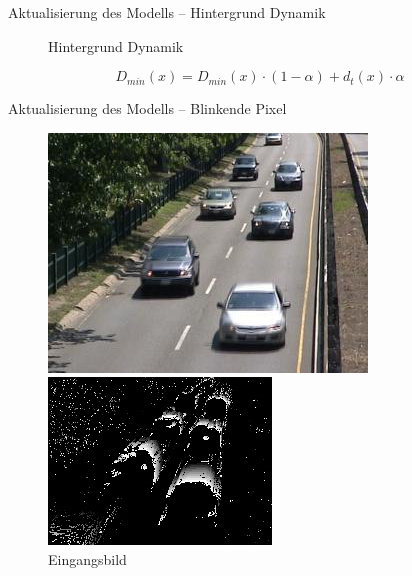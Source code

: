 \documentclass[hyperref={pdfpagelabels=false}]{beamer}
\begin{document}
\begin{frame}[t]{Aktualisierung des Modells -- Hintergrund Dynamik}
\begin{figure}
\begin{minipage}{0.45\linewidth}
			\caption*{Hintergrund Dynamik}
		\end{minipage}
	\end{figure}
	\bigskip
	\begin{equation*}
		D_{min}(x) = D_{min}(x) \cdot (1-\alpha) + d_t(x) \cdot \alpha
	\end{equation*}
\end{frame}

\begin{frame}[t]{Aktualisierung des Modells -- Blinkende Pixel}
	\vspace{1.65em}
	\begin{figure}
		\centering
		\begin{minipage}{0.45\linewidth}
			\includegraphics[width=1\linewidth]{Abbildungen/Eingang3.jpg}
			\caption*{Eingangsbild}
		\end{minipage}
		\begin{minipage}{0.45\linewidth}
			\includegraphics[width=1\linewidth]{Abbildungen/blinking_pixels1.jpg}

\end{minipage}
\end{figure}
\end{frame}
\end{document}
